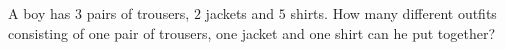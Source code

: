 A boy has $3$ pairs of trousers, $2$ jackets and $5$ shirts. How many different outfits consisting of one pair of trousers, one jacket and one shirt can he put together?
